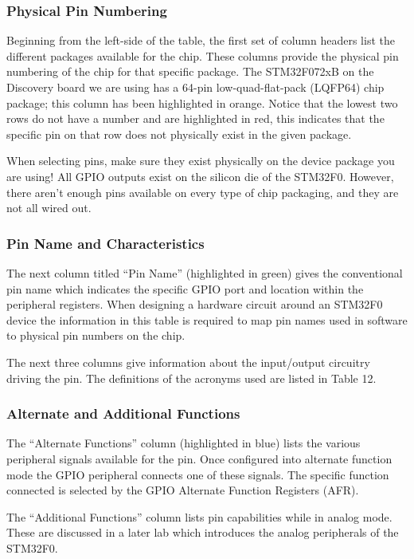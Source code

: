 \documentclass[openany,11pt,fleqn]{book} %
\begin{document}
    \subsubsection{Physical Pin Numbering}
    Beginning from the left-side of the table, the first set of column headers list the different packages available for the chip. These columns provide the physical pin numbering of the chip for that specific package. The STM32F072xB on the Discovery board we are using has a 64-pin low-quad-flat-pack (LQFP64) chip package; this column has been highlighted in orange. Notice that the lowest two rows do not have a number and are highlighted in red, this indicates that the specific pin on that row does not physically exist in the given package. 
    
    \begin{warning}
        When selecting pins, make sure they exist physically on the device package you are using! All GPIO outputs exist on the silicon die of the STM32F0. However, there aren't enough pins available on every type of chip packaging, and they are not all wired out.
    \end{warning}

    \subsubsection{Pin Name and Characteristics}
    The next column titled ``Pin Name'' (highlighted in green) gives the conventional pin name which indicates the specific GPIO port and location within the peripheral registers. When designing a hardware circuit around an STM32F0 device the information in this table is required to map pin names used in software to physical pin numbers on the chip. 
   
   The next three columns give information about the input/output circuitry driving the pin. The definitions of the acronyms used are listed in Table 12. 
    
    \subsubsection{Alternate and Additional Functions}
    The ``Alternate Functions'' column (highlighted in blue) lists the various peripheral signals available for the pin. Once configured into alternate function mode the GPIO peripheral connects one of these signals. The specific function connected is selected by the GPIO Alternate Function Registers (AFR).
    
    The ``Additional Functions'' column lists pin capabilities while in analog mode. These are discussed in a later lab which introduces the analog peripherals of the STM32F0.
\end{document}
